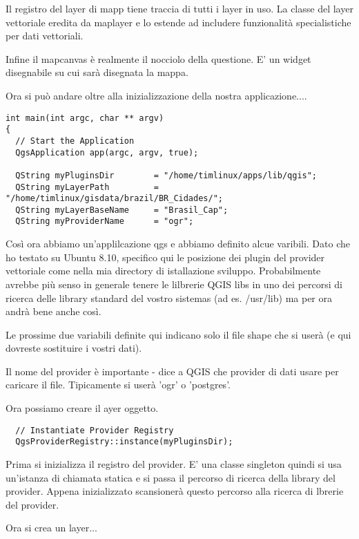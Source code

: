 Il registro del layer di mapp tiene traccia di tutti i layer in uso. La classe del layer vettoriale eredita da maplayer e lo estende ad includere funzionalità specialistiche per dati vettoriali.

Infine il mapcanvas è realmente il nocciolo della questione. E' un widget disegnabile su cui sarà disegnata la mappa.

Ora si può andare oltre alla inizializzazione della nostra applicazione....

\begin{verbatim}
int main(int argc, char ** argv)
{
  // Start the Application
  QgsApplication app(argc, argv, true);

  QString myPluginsDir        = "/home/timlinux/apps/lib/qgis";
  QString myLayerPath         = "/home/timlinux/gisdata/brazil/BR_Cidades/";
  QString myLayerBaseName     = "Brasil_Cap";
  QString myProviderName      = "ogr";

\end{verbatim}

Così ora abbiamo un'applilcazione qgs e abbiamo definito alcue varibili. Dato che ho testato su Ubuntu 8.10, specifico qui le posizione dei plugin del provider vettoriale come nella mia directory di istallazione sviluppo. Probabilmente avrebbe più senso in generale tenere le lilbrerie QGIS libs in uno dei percorsi di ricerca delle library standard del vostro sistemas (ad es. /usr/lib) ma per ora andrà bene anche così.

Le prossime due variabili definite qui indicano solo il file shape che si userà (e qui dovreste sostituire i vostri dati).

Il nome del provider è importante - dice a QGIS che provider di dati usare per caricare il file. Tipicamente si userà 'ogr' o 'postgres'.

Ora possiamo creare il ayer oggetto.

\begin{verbatim}
  // Instantiate Provider Registry
  QgsProviderRegistry::instance(myPluginsDir);
\end{verbatim}

Prima si inizializza il registro del provider. E' una classe singleton quindi si usa un'istanza di chiamata statica e si passa il percorso di ricerca della library del provider. Appena inizializzato scansionerà questo percorso alla ricerca di lbrerie del provider.

Ora si crea un layer...

